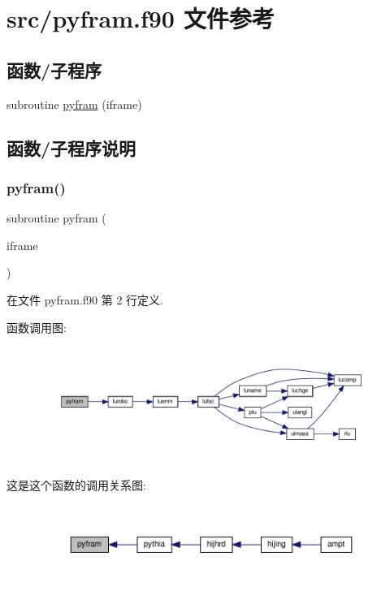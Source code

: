 \hypertarget{pyfram_8f90}{}\section{src/pyfram.f90 文件参考}
\label{pyfram_8f90}
\subsection*{函数/子程序}
\begin{DoxyCompactItemize}
\item 
subroutine \mbox{\hyperlink{pyfram_8f90_a1366db0f21e234c319190a150593fed9}{pyfram}} (iframe)
\end{DoxyCompactItemize}


\subsection{函数/子程序说明}
\mbox{\label{pyfram_8f90_a1366db0f21e234c319190a150593fed9}} 
\subsubsection{\texorpdfstring{pyfram()}{pyfram()}}
{\footnotesize\ttfamily subroutine pyfram (\begin{DoxyParamCaption}\item[{}]{iframe }\end{DoxyParamCaption})}



在文件 pyfram.\+f90 第 2 行定义.

函数调用图\+:
\nopagebreak
\begin{figure}[H]
\begin{center}
\leavevmode
\includegraphics[width=350pt]{pyfram_8f90_a1366db0f21e234c319190a150593fed9_cgraph}
\end{center}
\end{figure}
这是这个函数的调用关系图\+:
\nopagebreak
\begin{figure}[H]
\begin{center}
\leavevmode
\includegraphics[width=350pt]{pyfram_8f90_a1366db0f21e234c319190a150593fed9_icgraph}
\end{center}
\end{figure}
